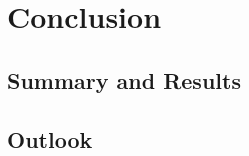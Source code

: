 \documentclass[%
	pdftex,%
	a4paper,%
	oneside,%
	chapterprefix,%
	headsepline,%
	12pt%
]{scrbook}
\begin{document}






\chapter{Conclusion}\label{conclusion}
\section{Summary and Results}
\section{Outlook}




% 

% 
\end{document}
